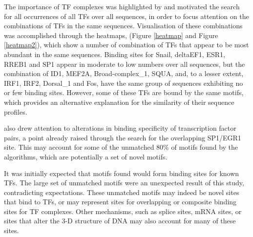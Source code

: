 \documentclass[12pt]{article}
\begin{document}
The importance of TF complexes was highlighted by \citet{Jolma2015} and motivated the search for all occurrences of all TFs over all sequences, in order to focus attention on the combinations of TFs in the same sequences. Visualisation of these combinations was accomplished through the heatmaps, (Figure \ref{heatmap} and Figure \ref{heatmap2}), which show a number of combination of TFs that appear to be most abundant in the same sequences. Binding sites for Snail, deltaEF1,  ESR1, RREB1 and SP1 appear in moderate to low numbers over all sequences, but the combination of ID1, MEF2A, Broad-complex{\_}1, SQUA, and, to a lesser extent, IRF1, IRF2, Dorsal{\_}1 and Fos, have the same group of sequences exhibiting no or few binding sites. However, some of these TFs are bound by the same motifs, which provides an alternative explanation for the similarity of their sequence profiles.

\citet{Jolma2015} also drew attention to alterations in binding specificity of transcription factor pairs, a point already raised through the search for the overlapping SP1/EGR1 site. This may account for some of the unmatched 80\% of motifs found by the algorithms, which are potentially a set of novel motifs.

It was initially expected that motifs found would form binding sites for known TFs. The large set of unmatched motifs were an unexpected result of this study, contradicting expectations. These unmatched motifs may indeed be novel sites that bind to TFs, or may represent sites for overlapping or composite binding sites for TF complexes. Other mechanisms, such as splice sites, mRNA sites, or sites that alter the 3-D structure of DNA may also account for many of these sites. 
\end{document}

